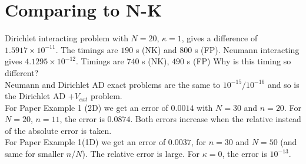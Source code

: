 \documentclass[11pt, a4paper]{article}
\theoremstyle{definition}
\begin{document}
	\section{Comparing to N-K}
Dirichlet interacting problem with $N = 20$, $\kappa = 1$, gives a difference of $1.5917 \times 10^{-11}$. The timings are $190$ s (NK) and $800$ s (FP).
Neumann interacting gives $4.1295 \times 10^{-12}$. Timings are $740$ s (NK), $490$ s (FP) Why is this timing so different?\\
Neumann and Dirichlet AD exact problems are the same to $10^{-15}/ 10^{-16}$ and so is the Dirichlet AD $+ V_{ext}$ problem.\\
For Paper Example 1 (2D) we get an error of $0.0014$ with $N = 30$ and $n = 20$. For $N = 20$, $n = 11$, the error is $0.0874$. Both errors increase when the relative instead of the absolute error is taken.\\
For Paper Example 1(1D) we get an error of $0.0037$, for $n = 30$ and $N = 50$ (and same for smaller $n$/$N$). The relative error is large. For $\kappa = 0$, the error is $10^{-13}$. 
\end{document}
